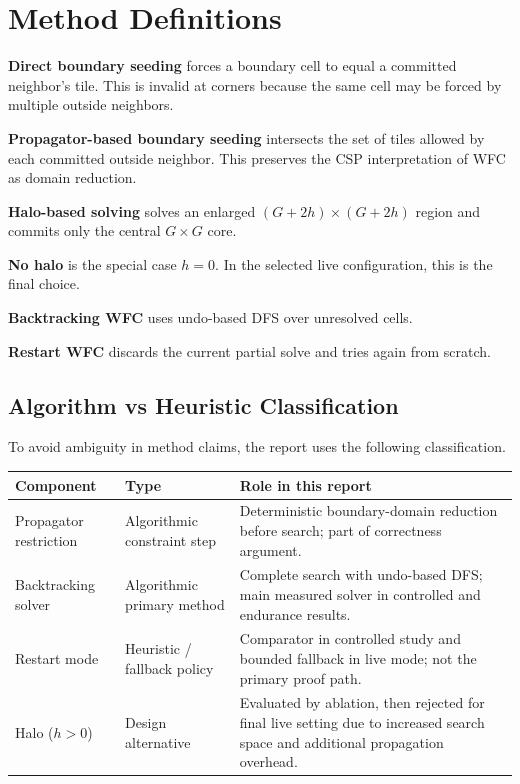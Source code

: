 \documentclass[12pt,a4paper]{report}
\begin{document}
\section{Method Definitions}
\textbf{Direct boundary seeding} forces a boundary cell to equal a committed neighbor's tile. This is invalid at corners because the same cell may be forced by multiple outside neighbors.

\textbf{Propagator-based boundary seeding} intersects the set of tiles allowed by each committed outside neighbor. This preserves the CSP interpretation of WFC as domain reduction.

\textbf{Halo-based solving} solves an enlarged $(G+2h)\times(G+2h)$ region and commits only the central $G\times G$ core.

\textbf{No halo} is the special case $h=0$. In the selected live configuration, this is the final choice.

\textbf{Backtracking WFC} uses undo-based DFS over unresolved cells.

\textbf{Restart WFC} discards the current partial solve and tries again from scratch.

\subsection*{Algorithm vs Heuristic Classification}
To avoid ambiguity in method claims, the report uses the following classification.

\begin{center}
\small
\begin{tabular}{p{3.0cm} p{3.3cm} p{5.6cm}}
\toprule
Component & Type & Role in this report \\
\midrule
Propagator restriction & Algorithmic constraint step & Deterministic boundary-domain reduction before search; part of correctness argument. \\
Backtracking solver & Algorithmic primary method & Complete search with undo-based DFS; main measured solver in controlled and endurance results. \\
Restart mode & Heuristic / fallback policy & Comparator in controlled study and bounded fallback in live mode; not the primary proof path. \\
Halo ($h>0$) & Design alternative & Evaluated by ablation, then rejected for final live setting due to increased search space and additional propagation overhead. \\
\bottomrule
\end{tabular}
\end{center}
\end{document}
